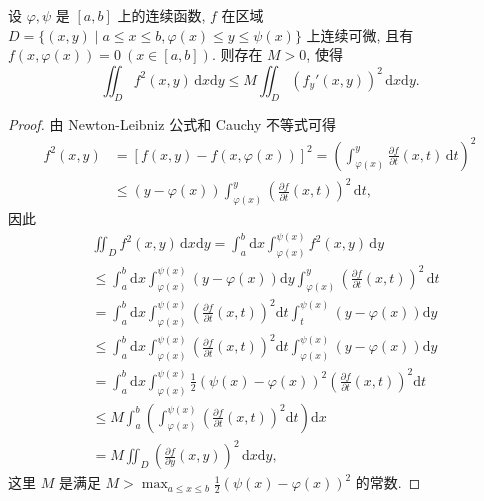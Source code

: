 \documentclass[../../main.tex]{subfiles}
\begin{document}
\begin{theorem}\label{theorem:Poincaré(庞加莱)不等式}
设 \(\varphi, \psi\) 是 \([a,b]\) 上的连续函数, \(f\) 在区域 \(D = \{(x,y) \mid a \leqslant x \leqslant b, \varphi(x) \leqslant y \leqslant \psi(x)\}\) 上连续可微, 且有 \(f(x, \varphi(x)) = 0\ (x \in [a,b])\). 则存在 \(M > 0\), 使得
\[
\iint_D f^2(x,y) \, \mathrm{d}x\mathrm{d}y \leqslant M \iint_D (f_y'(x,y))^2 \, \mathrm{d}x\mathrm{d}y.
\]
\end{theorem}
\begin{proof}
由 Newton-Leibniz 公式和 Cauchy 不等式可得
\begin{align*}
f^2(x,y)&=[f(x,y)-f(x,\varphi (x))]^2=\left( \int_{\varphi (x)}^y{\frac{\partial f}{\partial t}(x,t)\,\mathrm{d}t} \right) ^2
\\
&\leqslant (y-\varphi (x))\int_{\varphi (x)}^y{\left( \frac{\partial f}{\partial t}(x,t) \right) ^2\,\mathrm{d}t},
\end{align*}
因此
\begin{align*}
&\iint_D{f^2\left( x,y \right) \,\mathrm{d}x\mathrm{d}y}=\int_a^b{\mathrm{d}x}\int_{\varphi \left( x \right)}^{\psi \left( x \right)}{f^2\left( x,y \right) \,\mathrm{d}y}
\\
&\leqslant \int_a^b{\mathrm{d}x}\int_{\varphi \left( x \right)}^{\psi \left( x \right)}{\left( y-\varphi \left( x \right) \right) \mathrm{d}y}\int_{\varphi \left( x \right)}^y{\left( \frac{\partial f}{\partial t}\left( x,t \right) \right) ^2\,\mathrm{d}t}
\\
&=\int_a^b{\mathrm{d}x}\int_{\varphi \left( x \right)}^{\psi \left( x \right)}{\left( \frac{\partial f}{\partial t}\left( x,t \right) \right) ^2\mathrm{d}t}\int_t^{\psi \left( x \right)}{\left( y-\varphi \left( x \right) \right) \mathrm{d}y}
\\
&\leqslant \int_a^b{\mathrm{d}x}\int_{\varphi \left( x \right)}^{\psi \left( x \right)}{\left( \frac{\partial f}{\partial t}\left( x,t \right) \right) ^2\mathrm{d}t}\int_{\varphi \left( x \right)}^{\psi \left( x \right)}{\left( y-\varphi \left( x \right) \right) \mathrm{d}y}
\\
&=\int_a^b{\mathrm{d}x}\int_{\varphi \left( x \right)}^{\psi \left( x \right)}{\frac{1}{2}\left( \psi \left( x \right) -\varphi \left( x \right) \right) ^2\left( \frac{\partial f}{\partial t}\left( x,t \right) \right) ^2\mathrm{d}t}
\\
&\leqslant M\int_a^b{\left( \int_{\varphi \left( x \right)}^{\psi \left( x \right)}{\left( \frac{\partial f}{\partial t}\left( x,t \right) \right) ^2\mathrm{d}t} \right) \mathrm{d}x}
\\
&=M\iint_D{\left( \frac{\partial f}{\partial y}\left( x,y \right) \right) ^2\,\mathrm{d}x\mathrm{d}y},
\end{align*}
这里 \(M\) 是满足 \(M > \max_{a \leqslant x \leqslant b} \frac{1}{2} (\psi(x) - \varphi(x))^2\) 的常数.
\end{proof}
\end{document}
